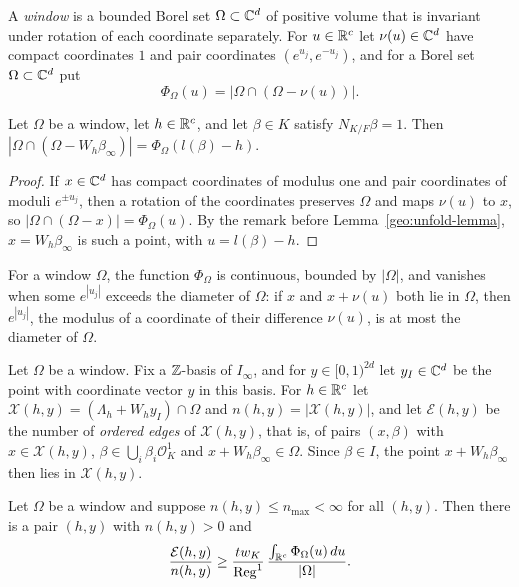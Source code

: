 \begin{definition}\label{geo:window}
A \emph{window} is a bounded Borel set $\Omega\subset\mathbb C^d$ of positive
volume that is invariant under rotation of each coordinate separately.
For $u\in\mathbb R^c$ let $\nu(u)\in\mathbb C^d$ have compact coordinates $1$ and
pair coordinates $(e^{u_j},e^{-u_j})$, and for a Borel set
$\Omega\subset\mathbb C^d$ put
\[
 \Phi_\Omega(u)=|\Omega\cap(\Omega-\nu(u))|.
\]
\end{definition}

\begin{lemma}\label{geo:phi-omega}
Let $\Omega$ be a window, let $h\in\mathbb R^c$, and let $\beta\in K$ satisfy
$N_{K/F}\beta=1$. Then
$|\Omega\cap(\Omega-W_h\beta_\infty)|=\Phi_\Omega(l(\beta)-h)$.
\end{lemma}

\begin{proof}
If $x\in\mathbb C^d$ has compact coordinates of modulus one and pair
coordinates of moduli $e^{\pm u_j}$, then a rotation of the coordinates
preserves $\Omega$ and maps $\nu(u)$ to $x$, so
$|\Omega\cap(\Omega-x)|=\Phi_\Omega(u)$. By the remark before
Lemma~\ref{geo:unfold-lemma}, $x=W_h\beta_\infty$ is such a point, with
$u=l(\beta)-h$.
\end{proof}

For a window $\Omega$, the function $\Phi_\Omega$ is continuous, bounded
by $|\Omega|$, and vanishes when some $e^{|u_j|}$ exceeds the diameter of
$\Omega$: if $x$ and $x+\nu(u)$ both lie in $\Omega$, then $e^{|u_j|}$,
the modulus of a coordinate of their difference $\nu(u)$, is at most the
diameter of $\Omega$.

Let $\Omega$ be a window. Fix a $\mathbb Z$-basis of $I_\infty$, and for
$y\in[0,1)^{2d}$ let $y_I\in\mathbb C^d$ be the point with coordinate vector $y$
in this basis. For $h\in\mathbb R^c$ let
$\mathcal X(h,y)=(\Lambda_h+W_hy_I)\cap\Omega$ and
$n(h,y)=|\mathcal X(h,y)|$, and let $\mathcal E(h,y)$ be the number of
\emph{ordered edges} of $\mathcal X(h,y)$, that is, of pairs $(x,\beta)$
with $x\in\mathcal X(h,y)$, $\beta\in\bigcup_i\beta_i\mathcal O_K^1$ and
$x+W_h\beta_\infty\in\Omega$. Since $\beta\in I$, the point
$x+W_h\beta_\infty$ then lies in $\mathcal X(h,y)$.

\begin{lemma}\label{geo:joint-average-lemma}
Let $\Omega$ be a window and suppose $n(h,y)\le n_{\max}<\infty$ for
all $(h,y)$. Then there is a pair $(h,y)$ with $n(h,y)>0$ and
\begin{equation}\label{geo:joint-average}
 \frac{\mathcal E(h,y)}{n(h,y)}\ge
 \frac{tw_K}{\operatorname{Reg}^1}\,
 \frac{\int_{\mathbb R^c}\Phi_\Omega(u)\,du}{|\Omega|}.
\end{equation}
\end{lemma}

